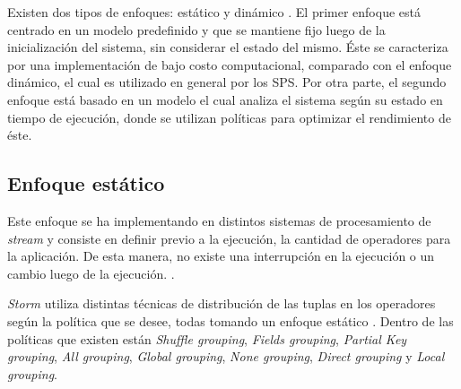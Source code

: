 Existen dos tipos de enfoques: est\'atico y din\'amico \citep{Gupta99loadsharing}. El primer enfoque est\'a centrado en un modelo predefinido y que se mantiene fijo luego de la inicializaci\'on del sistema, sin considerar el estado del mismo. \normalsize{\'Este se caracteriza por una implementaci\'on de bajo costo computacional, comparado con el enfoque din\'amico, el cual es utilizado en general por los SPS. Por otra parte, el segundo enfoque est\'a basado en un modelo el cual analiza el sistema seg\'un su estado en tiempo de ejecuci\'on, donde se utilizan pol\'iticas para optimizar el rendimiento de \'este.}


\subsection{Enfoque est\'atico}
\label{subsec:enfoqueEstaticoBC}
Este enfoque se ha implementando en distintos sistemas de procesamiento de \textsl{stream} y consiste en definir previo a la ejecuci\'on, la cantidad de operadores para la aplicaci\'on. De esta manera, no existe una interrupci\'on en la ejecuci\'on o un cambio luego de la ejecuci\'on. \citep{CasavantK88}.


\textsl{Storm} utiliza distintas t\'ecnicas de distribuci\'on de las tuplas en los operadores seg\'un la pol\'itica que se desee, todas tomando un enfoque est\'atico \citep{stormtwitter}. Dentro de las pol\'iticas que existen est\'an \textit{Shuffle grouping}, \textit{Fields grouping}, \textit{Partial Key grouping}, \textit{All grouping}, \textit{Global grouping}, \textit{None grouping}, \textit{Direct grouping} y \textit{Local grouping}.

